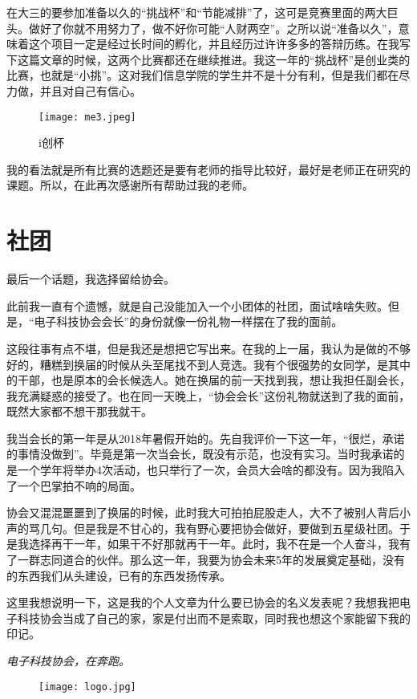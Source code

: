 \documentclass[cn,11pt]{elegantbook}
\begin{document}
在大三的要参加准备以久的“挑战杯”和“节能减排”了，这可是竞赛里面的两大巨头。做好了你就不用努力了，做不好你可能“人财两空”。之所以说“准备以久”，意味着这个项目一定是经过长时间的孵化，并且经历过许许多多的答辩历练。在我写下这篇文章的时候，这两个比赛都还在继续推进。我这一年的“挑战杯”是创业类的比赛，也就是“小挑”。这对我们信息学院的学生并不是十分有利，但是我们都在尽力做，并且对自己有信心。

\begin{figure}[htbp]
	\centering
	\texttt{[image: me3.jpeg]}
	\caption{ i创杯 }
\end{figure}

我的看法就是所有比赛的选题还是要有老师的指导比较好，最好是老师正在研究的课题。所以，在此再次感谢所有帮助过我的老师。

\section{社团}

最后一个话题，我选择留给协会。

此前我一直有个遗憾，就是自己没能加入一个小团体的社团，面试啥啥失败。但是，“电子科技协会会长”的身份就像一份礼物一样摆在了我的面前。

这段往事有点不堪，但是我还是想把它写出来。在我的上一届，我认为是做的不够好的，糟糕到换届的时候从头至尾找不到人竞选。我有个很强势的女同学，是其中的干部，也是原本的会长候选人。她在换届的前一天找到我，想让我担任副会长，我充满疑惑的接受了。也在同一天晚上，“协会会长”这份礼物就送到了我的面前，既然大家都不想干那我就干。

我当会长的第一年是从2018年暑假开始的。先自我评价一下这一年，“很烂，承诺的事情没做到”。毕竟是第一次当会长，既没有示范，也没有实习。当时我承诺的是一个学年将举办4次活动，也只举行了一次，会员大会啥的都没有。因为我陷入了一个巴掌拍不响的局面。

协会又混混噩噩到了换届的时候，此时我大可拍拍屁股走人，大不了被别人背后小声的骂几句。但是我是不甘心的，我有野心要把协会做好，要做到五星级社团。于是我选择再干一年，如果干不好那就再干一年。此时，我不在是一个人奋斗，我有了一群志同道合的伙伴。那么这一年，我要为协会未来5年的发展奠定基础，没有的东西我们从头建设，已有的东西发扬传承。

这里我想说明一下，这是我的个人文章为什么要已协会的名义发表呢？我想我把电子科技协会当成了自己的家，家是付出而不是索取，同时我也想这个家能留下我的印记。

\emph{电子科技协会，在奔跑。}

\begin{figure}[htbp]
	\centering
	\texttt{[image: logo.jpg]}
\end{figure}
\end{document}
